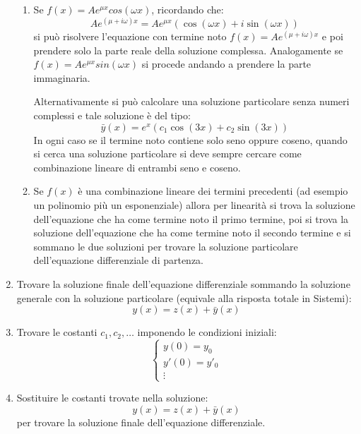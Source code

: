 \documentclass{article}
\begin{document}
\begin{enumerate}
\begin{enumerate}
    \item Se \( f(x) = A e^{\mu x} cos(\omega x) \),
      ricordando che:
      \[
        A e^{(\mu + i \omega)x} = A e^{\mu x} \left(\cos(\omega x) + i \sin(\omega x)\right)
      \] 
      si può risolvere l'equazione con termine noto \( f(x) = A e^{(\mu + i \omega)x} \)
      e poi prendere solo la parte reale della soluzione complessa. Analogamente se
      \( f(x) = A e^{\mu x} sin(\omega x) \) si procede andando a prendere la parte
      immaginaria.

      Alternativamente si può calcolare una soluzione particolare senza numeri complessi
      e tale soluzione è del tipo:
      \[
        \bar{y}(x) = e^{x} \left( c_1 \cos(3x) + c_2 \sin(3x) \right) 
      \] 
      In ogni caso se il termine noto contiene solo seno oppure coseno, quando si cerca 
      una soluzione particolare si deve sempre cercare come combinazione lineare di 
      entrambi seno e coseno.

    \item Se \( f(x) \) è una combinazione lineare dei termini precedenti (ad esempio
      un polinomio più un esponenziale) allora per linearità si trova la soluzione
      dell'equazione che ha come termine noto il primo termine, poi si trova la soluzione
      dell'equazione che ha come termine noto il secondo termine e si sommano le due
      soluzioni per trovare la soluzione particolare dell'equazione differenziale di partenza.
    \end{enumerate}

  \item Trovare la soluzione finale dell'equazione differenziale sommando la soluzione
    generale con la soluzione particolare (equivale alla risposta totale in Sistemi):
    \[
      y(x) = z(x) + \bar{y}(x)
    \] 

  \item Trovare le costanti \( c_1, c_2, \ldots \) imponendo le condizioni iniziali:
    \[
      \begin{cases}
        y(0) = y_0 \\
        y'(0) = y'_0 \\
        \vdots
      \end{cases}
    \] 

  \item Sostituire le costanti trovate nella soluzione:
    \[
      y(x) = z(x) + \bar{y}(x)
    \] 
    per trovare la soluzione finale dell'equazione differenziale.
\end{enumerate}
    
\end{document}
